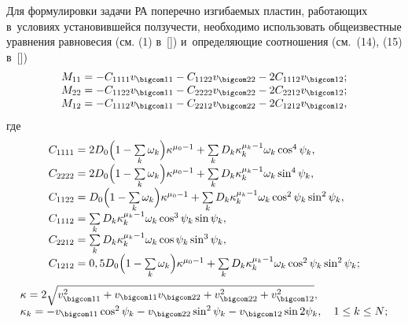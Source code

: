 Для формулировки задачи РА поперечно изгибаемых пластин, работающих в~условиях установившейся ползучести, необходимо использовать общеизвестные уравнения равновесия (см. (1) в~[]) и~определяющие соотношения (см.~(14), (15) в~[])
\begin{equation} \label{yank:eq1}
\begin{array}{c}
 M_{11} =-C_{1111} v_{\bigcom 11} -C_{1122} v_{\bigcom 22} -2C_{1112} v_{\bigcom 12}; \\
 M_{22} =-C_{1122} v_{\bigcom 11} -C_{2222} v_{\bigcom 22} -2C_{2212} v_{\bigcom 12}; \\
 M_{12} =-C_{1112} v_{\bigcom 11} -C_{2212} v_{\bigcom 22} -2C_{1212} v_{\bigcom 12}, \\
 \end{array}
\end{equation}
где
\begin{equation} 
\label{yank:eq2}
\begin{array}{l}
 C_{1111} =2D_0  \Bigl( 1  -\sum\limits_k \omega_k \Bigr) \kappa^{\mu_0  -1}+
 \sum\limits_k D_k \kappa_k ^{\mu_k  -1} \omega_k   \cos^{4}\psi_k , 
 \\
 C_{2222} =2D_0  \Bigl( 1  -\sum\limits_k \omega_k \Bigr) \kappa^{\mu_0  -1}+
 \sum\limits_k D_k \kappa_k ^{\mu_k -1} \omega_k   \sin^{4}\psi_k , 
 \\
 C_{1122} =D_0  \Bigl( 1  -\sum\limits_k \omega_k \Bigr) \kappa^{\mu_0  -1}+
 \sum\limits_k D_k \kappa_k ^{\mu_k -1} \omega_k  \cos^2 \psi_k  \sin^2 \psi_k , \\
 C_{1112} =\sum\limits_k D_k \kappa_k ^{\mu_k  -1} \omega_k   \cos ^{3}\psi_k  \sin \psi_k ,\\
 C_{2212} =\sum\limits_k D_k \kappa_k ^{\mu_k  -1} \omega_k   \cos \psi_k  \sin^{3}\psi_k , \\
 C_{1212} =0,5D_0  \Bigl( 1  -\sum\limits_k \omega_k \Bigr) \kappa^{\mu_0  -1}+
 \sum\limits_k D_k \kappa_k ^{\mu_k -1} \omega_k   \cos^2 \psi_k  \sin^2 \psi_k ; \\
 \end{array}
\end{equation}
\begin{equation} 
\label{yank:eq3}
\begin{array}{l}
 \kappa =2\sqrt {v_{\bigcom 11}^2  +v_{\bigcom 11} v_{\bigcom 22} +v_{\bigcom 22}^2  +v_{\bigcom 12}^2 },\\
 \kappa_k  =-v_{\bigcom 11} \cos^2 \psi_k  -v_{\bigcom 22} \sin^2 \psi_k -v_{\bigcom 12} \sin 2\psi_k,  \quad 1\le k\le N; 
\end{array}
\end{equation}

